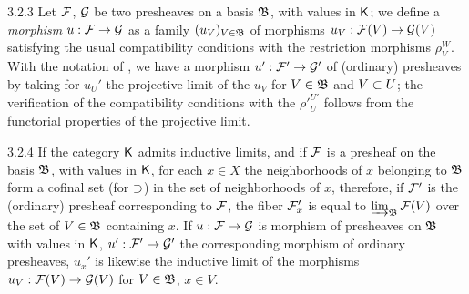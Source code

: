 \documentclass[../main.tex]{subfiles}
\begin{document}
\begin{env}{3.2.3}
Let $\mathcal{F}$, $\mathcal{G}$ be two presheaves on a basis $\mathfrak{B}$, with values in $\mathsf{K}$; we define a \emph{morphism}
$u:\mathcal{F}\to\mathcal{G}$ as a family $(u_V)_{V\in\mathfrak{B}}$ of morphisms $u_V:\mathcal{F}(V)\to\mathcal{G}(V)$ satisfying the usual
compatibility conditions with the restriction morphisms $\rho_V^W$. With the notation of ,
we have a morphism $u':\mathcal{F}'\to\mathcal{G}'$ of (ordinary) presheaves by taking for $u_U'$ the projective limit
of the $u_V$ for $V\in\mathfrak{B}$ and $V\subset U$; the verification of the compatibility conditions with
the ${\rho'}_U^{U'}$ follows from the functorial properties of the projective limit.
\end{env}

\begin{env}{3.2.4}
If the category $\mathsf{K}$ admits inductive limits, and if $\mathcal{F}$ is a presheaf on the basis $\mathfrak{B}$, with
values in $\mathsf{K}$, for each $x\in X$ the neighborhoods of $x$ belonging to $\mathfrak{B}$ form a cofinal set
(for $\supset$) in the set of neighborhoods of $x$, therefore, if $\mathcal{F}'$ is the (ordinary) presheaf
corresponding to $\mathcal{F}$, the fiber $\mathcal{F}_x'$ is equal to $\varinjlim_{\mathfrak{B}}\mathcal{F}(V)$ over the set of
$V\in\mathfrak{B}$ containing $x$. If $u:\mathcal{F}\to\mathcal{G}$ is morphism of presheaves on $\mathfrak{B}$ with values in
$\mathsf{K}$, $u':\mathcal{F}'\to\mathcal{G}'$ the corresponding morphism of ordinary presheaves, $u_x'$ is likewise the
inductive limit of the morphisms $u_V:\mathcal{F}(V)\to\mathcal{G}(V)$ for $V\in\mathfrak{B}$, $x\in V$.
\end{env}
\end{document}
